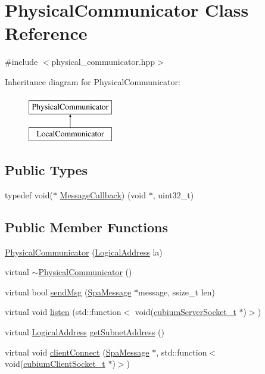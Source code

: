 \hypertarget{classPhysicalCommunicator}{}\section{Physical\+Communicator Class Reference}
\label{classPhysicalCommunicator}


{\ttfamily \#include $<$physical\+\_\+communicator.\+hpp$>$}

Inheritance diagram for Physical\+Communicator\+:\begin{figure}[H]
\begin{center}
\leavevmode
\includegraphics[height=2.000000cm]{classPhysicalCommunicator}
\end{center}
\end{figure}
\subsection*{Public Types}
\begin{DoxyCompactItemize}
\item 
typedef void($\ast$ \hyperlink{classPhysicalCommunicator_ac0fb9cea7a3e3ffecedc57be9684ebbf}{Message\+Callback}) (void $\ast$, uint32\+\_\+t)
\end{DoxyCompactItemize}
\subsection*{Public Member Functions}
\begin{DoxyCompactItemize}
\item 
\hyperlink{classPhysicalCommunicator_a6895d0ce73240eb80d0b9a060da7c728}{Physical\+Communicator} (\hyperlink{structLogicalAddress}{Logical\+Address} la)
\item 
virtual \hyperlink{classPhysicalCommunicator_ab81e6bd21e71a33a5835c16e74ffd324}{$\sim$\+Physical\+Communicator} ()
\item 
virtual bool \hyperlink{classPhysicalCommunicator_a9fc5595b693f9908a20d0e64a6579bb5}{send\+Msg} (\hyperlink{structSpaMessage}{Spa\+Message} $\ast$message, ssize\+\_\+t len)
\item 
virtual void \hyperlink{classPhysicalCommunicator_a4886f4453c1f830ceaef56bc8602423f}{listen} (std\+::function$<$ void(\hyperlink{structcubiumServerSocket__t}{cubium\+Server\+Socket\+\_\+t} $\ast$)$>$)
\item 
virtual \hyperlink{structLogicalAddress}{Logical\+Address} \hyperlink{classPhysicalCommunicator_a80f3bdf1beb61e5f6721e30fdc4d5d7f}{get\+Subnet\+Address} ()
\item 
virtual void \hyperlink{classPhysicalCommunicator_a5984183c86e19370215736688d905fe6}{client\+Connect} (\hyperlink{structSpaMessage}{Spa\+Message} $\ast$, std\+::function$<$ void(\hyperlink{structcubiumClientSocket__t}{cubium\+Client\+Socket\+\_\+t} $\ast$)$>$)
\end{DoxyCompactItemize}
